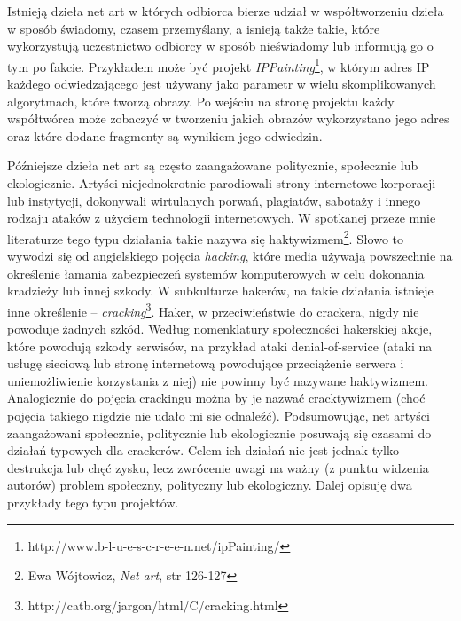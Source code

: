 \documentclass[a4paper,12pt,twoside]{article}
\begin{document}
Istnieją dzieła net art w których odbiorca bierze udział w współtworzeniu
dzieła w sposób świadomy, czasem przemyślany, a isnieją także takie,
które wykorzystują uczestnictwo odbiorcy w sposób nieświadomy lub informują
go o tym po fakcie. Przykładem może być projekt
\textit{IPPainting}\footnote{ http://www.b-l-u-e-s-c-r-e-e-n.net/ipPainting/},
w którym adres IP każdego odwiedzającego jest używany jako parametr w wielu
skomplikowanych algorytmach, które tworzą obrazy. Po wejściu na stronę
projektu każdy współtwórca może zobaczyć w tworzeniu jakich obrazów
wykorzystano jego adres oraz które dodane fragmenty są wynikiem jego odwiedzin.

Późniejsze dzieła net art są często zaangażowane politycznie, społecznie
lub ekologicznie. Artyści niejednokrotnie parodiowali strony internetowe
korporacji lub instytycji, dokonywali wirtulanych porwań, plagiatów,
sabotaży i innego rodzaju ataków z użyciem technologii internetowych.
W spotkanej przeze mnie literaturze tego typu działania takie nazywa się
haktywizmem\footnote{ Ewa Wójtowicz, \textit{Net art}, str 126-127}.
Słowo to wywodzi się od angielskiego pojęcia \textit{hacking},
które media używają powszechnie na określenie łamania zabezpieczeń
systemów komputerowych w celu dokonania kradzieży lub innej szkody.
W subkulturze hakerów, na takie działania istnieje inne określenie --
\textit{cracking}\footnote{ http://catb.org/jargon/html/C/cracking.html}.
Haker, w przeciwieństwie do crackera, nigdy nie
powoduje żadnych szkód. Według nomenklatury społeczności hakerskiej
akcje, które powodują szkody serwisów, na przykład ataki denial-of-service
(ataki na usługę sieciową lub stronę internetową powodujące przeciążenie
serwera i uniemożliwienie korzystania z niej) nie powinny być nazywane
haktywizmem. Analogicznie do pojęcia crackingu można by je nazwać
cracktywizmem (choć pojęcia takiego nigdzie nie udało mi sie odnaleźć).
Podsumowując, net artyści zaangażowani społecznie, politycznie lub
ekologicznie posuwają się czasami do działań typowych dla crackerów.
Celem ich działań nie jest jednak tylko destrukcja lub chęć zysku,
lecz zwrócenie uwagi na ważny (z punktu widzenia autorów) problem
społeczny, polityczny lub ekologiczny. Dalej opisuję dwa przykłady
tego typu projektów.
\end{document}
